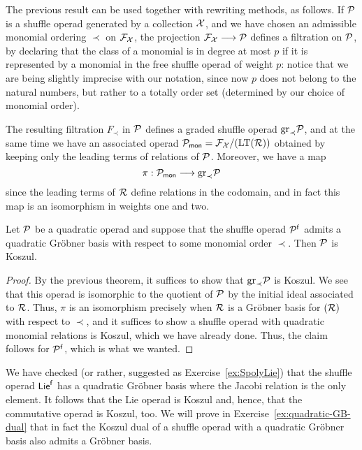  The previous result can be used together with
 rewriting methods, as follows. If ${\mathcal{P}}$ is
 a shuffle operad generated by a collection
 $\mathcal{X}$, and we have chosen an admissible 
 monomial ordering $\prec $
 on $\mathcal{F}_{\mathcal{X}}$, the projection
 $\mathcal{F}_{\mathcal{X}}\longrightarrow {\mathcal{P}}$ defines a filtration
 on ${\mathcal{P}}$, by declaring that the class of a 
 monomial is in degree at most $p$ if it
 is represented by a monomial in the free shuffle
 operad of weight $p$: notice that we are being
 slightly imprecise with our notation, since now
 $p$ does not belong to the natural numbers,
 but rather to a totally order set (determined by
 our choice of monomial order).
 
 The resulting filtration $F_\prec$ in ${\mathcal{P}}$
 defines a graded shuffle operad $\mathrm{gr}_\prec
 {\mathcal{P}}$, and at the same time we have an associated
 operad ${\mathcal{P}}_{\mathsf{mon}} = \mathcal{F}_{\mathcal{X}} / (\operatorname{LT}(\mathcal{R}))$
 obtained by keeping only the leading terms
 of relations of ${\mathcal{P}}$. Moreover, we have a map
 \[
 \pi : {\mathcal{P}}_{\mathsf{mon}} 
  	\longrightarrow 
  	\mathrm{gr}_\prec {\mathcal{P}}
 \]
 since the leading terms of $\mathcal{R}$ define
 relations in the codomain, and in fact this
 map is an isomorphism in weights one and two.
 
 \begin{theorem}
 Let ${\mathcal{P}}$ be a quadratic operad and suppose
 that the shuffle operad ${\mathcal{P}}^{\mathsf{f}}$ admits a
 quadratic Gr\"obner basis with respect to some
 monomial order $\prec$. Then ${\mathcal{P}}$ is
 Koszul. 
 \end{theorem}
 
 \begin{proof}
 By the previous theorem, it suffices to show
 that $\mathrm{gr}_\prec {\mathcal{P}}$ is Koszul. We
 see that this operad is isomorphic to the
 quotient of ${\mathcal{P}}$ by the initial ideal associated
 to $\mathcal{R}$. Thus, $\pi$ is an isomorphism 
 precisely when $\mathcal{R}$ is a Gr\"obner basis
 for $(\mathcal{R})$ with respect to $\prec$, and
 it suffices to show
 a shuffle operad with quadratic monomial
 relations is Koszul, which we have
 already done. Thus,
 the claim follows for
 ${\mathcal{P}}^{\mathsf{f}}$, which is what we wanted. 
 \end{proof}
 

\begin{example}
We have checked (or rather, suggested as Exercise~\ref{ex:SpolyLie})
that the shuffle operad $\mathsf{Lie}^{\mathsf{f}}$ has a quadratic Gr\"obner
basis where the Jacobi relation is the only element. It follows
that the Lie operad is Koszul and, hence, that the commutative
operad is Koszul, too. We will prove in Exercise~\ref{ex:quadratic-GB-dual} that in fact the Koszul dual of a shuffle operad with
a quadratic Gr\"obner basis also admits a Gr\"obner basis.
\end{example}

